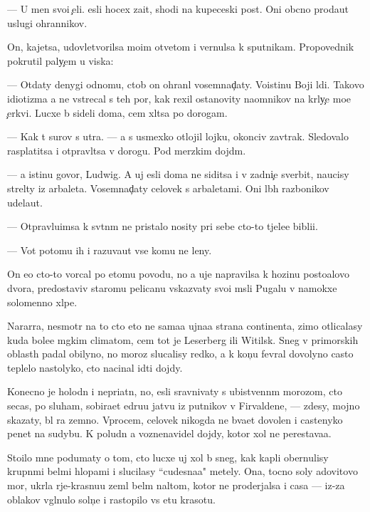 \documentclass[10pt]{book}
\begin{document}
— U men{\ia} svo{\y}i {\c}eli. {\Y}esli hocex za{\x}it{\yi}, shodi na kupeceski{\y} post. Oni ob{\yi}cno proda{\y}ut uslugi ohrannikov.

On, kajetsa, udovletvorilsa mo{\y}im otvetom i vernulsa k sputnikam. Propovednik pokrutil paly{\c}em u viska:

— Otdaty denygi odnomu, ctob{\yi} on ohran{\ia}l vosemnad{\c}aty. Voistinu Boj{\yf}i l{\io}di. Takovo idiotizma {\y}a ne vstrecal s teh por, kak rexil ostanovity na{\y}omnikov na kr{\yi}ly{\c}e mo{\y}e{\y} {\c}erkvi. Lucxe b{\yi} sideli doma, cem xl{\ia}tsa po dorogam.

— Kak t{\yi} surov s utra. — {\Y}a s usmexko{\y} otlojil lojku, okonciv zavtrak. Sledovalo rasplatitsa i otpravl{\ia}tsa v dorogu. Pod merzkim dojd{\e}m.

— {\Y}a istinu govor{\io}, Ludwig. A uj {\y}esli doma ne siditsa i v zadni{\c}e sverbit, naucisy strel{\ia}ty iz arbaleta. Vosemnad{\c}aty celovek s arbaletami. Oni l{\io}b{\yi}h razbo{\y}nikov udela{\y}ut.

— Otpravl{\ia}{\y}u{\x}imsa k sv{\ia}t{\yi}n{\ia}m ne pristalo nosity pri sebe cto-to t{\ia}jele{\y}e bibli{\y}i.

— Vot potomu ih i razuva{\y}ut vse komu ne leny.

On {\y}e{\x}o cto-to vorcal po etomu povodu, no {\y}a uje napravilsa k hoz{\ia}{\y}inu posto{\y}alovo dvora, predostaviv staromu pelicanu v{\yi}skaz{\yi}vaty svo{\y}i m{\yi}sli Pugalu v namokxe{\y} solomenno{\y} xl{\ia}pe.



Nararra, nesmotr{\ia} na to cto eto ne sama{\y}a {\y}ujna{\y}a strana continenta, zimo{\y} otlicalasy kuda bole{\y}e m{\ia}gkim climatom, cem tot je Leserberg ili Witilsk. Sneg v primorskih oblast{\ia}h padal obilyno, no moroz{\yi} slucalisy redko, a k kon{\c}u fevral{\ia} dovolyno casto teplelo nastolyko, cto nacinal idti dojdy.

Konecno je holodn{\yi}{\y} i nepri{\y}atn{\yi}{\y}, no, {\y}esli sravnivaty s ubi{\y}stvenn{\yi}m morozom, cto se{\y}cas, po sluham, sobira{\y}et {\x}edru{\y}u jatvu iz putnikov v Firvaldene, — zdesy, mojno skazaty, b{\yi}l ra{\y} zemno{\y}. Vprocem, celovek nikogda ne b{\yi}va{\y}et dovolen i castenyko pen{\ia}{\y}et na sudybu. K poludn{\io} {\y}a voznenavidel dojdy, kotor{\yi}{\y} xol ne perestava{\y}a.

Sto{\y}ilo mne podumaty o tom, cto lucxe uj xol b{\yi} sneg, kak kapli obernulisy krupn{\yi}mi bel{\yi}mi hlop{\y}ami i slucilasy ``cudesna{\y}a" metely. Ona, tocno soly {\Y}adovitovo mor{\ia}, ukr{\yi}la r{\yi}je-krasnu{\y}u zeml{\io} bel{\yi}m nal{\e}tom, kotor{\yi}{\y} ne proderjalsa i casa — iz-za oblakov v{\yi}gl{\ia}nulo soln{\c}e i rastopilo vs{\io} etu krasotu.
\end{document}
